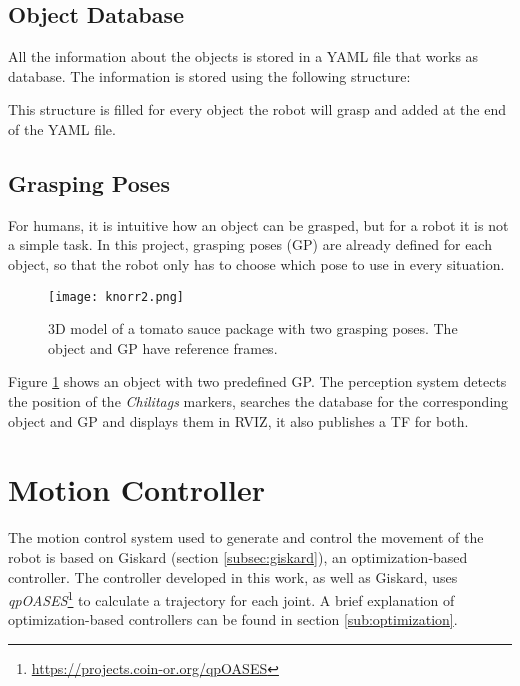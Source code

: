 \subsection{Object Database}
\label{sec:db}
All the information about the objects is stored in a YAML file that works as database. The information is stored using the following structure:



This structure is filled for every object the robot will grasp and added at the end of the YAML file.

\subsection{Grasping Poses}

For humans, it is intuitive how an object can be grasped, but for a robot it is not a simple task. In this project, grasping poses (GP) are already defined for each object, so that the robot only has to choose which pose to use in every situation.
\begin{figure}[H]
	\centering
		{\texttt{[image: knorr2.png]}}
	\vspace{-12pt}
	\caption[Grasping poses]{3D model of a tomato sauce package with two grasping poses. The object and GP have reference frames.}
	\vspace{-10pt}
	\label{fig:knorr}
\end{figure}

Figure \ref{fig:knorr} shows an object with two predefined GP. The perception system detects the position of the \textit{Chilitags} markers, searches the database for the corresponding object and GP and displays them in RVIZ, it also publishes a TF for both.


\section{Motion Controller}
\label{sec:motion_controller}

The motion control system used  to generate and control the movement of the robot is based on Giskard (section \ref{subsec:giskard}), an optimization-based controller. The controller developed in this work, as well as Giskard, uses \textit{qpOASES}\footnote{\url{https://projects.coin-or.org/qpOASES}}  to calculate a trajectory for each joint. A brief explanation of optimization-based controllers can be found in section \ref{sub:optimization}.

